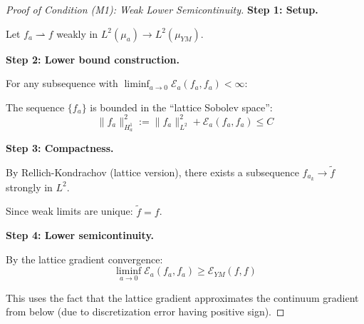 \begin{proof}[Proof of Condition (M1): Weak Lower Semicontinuity]

\textbf{Step 1: Setup.}

Let $f_a \rightharpoonup f$ weakly in $L^2(\mu_a) \to L^2(\mu_{YM})$.

\textbf{Step 2: Lower bound construction.}

For any subsequence with $\liminf_{a \to 0} \mathcal{E}_a(f_a, f_a) < \infty$:

The sequence $\{f_a\}$ is bounded in the ``lattice Sobolev space'':
\begin{equation}
\|f_a\|_{H^1_a}^2 := \|f_a\|_{L^2}^2 + \mathcal{E}_a(f_a, f_a) \leq C
\end{equation}

\textbf{Step 3: Compactness.}

By Rellich-Kondrachov (lattice version), there exists a subsequence 
$f_{a_k} \to \tilde{f}$ strongly in $L^2$.

Since weak limits are unique: $\tilde{f} = f$.

\textbf{Step 4: Lower semicontinuity.}

By the lattice gradient convergence:
\begin{equation}
\liminf_{a \to 0} \mathcal{E}_a(f_a, f_a) \geq \mathcal{E}_{YM}(f, f)
\end{equation}

This uses the fact that the lattice gradient approximates the continuum 
gradient from below (due to discretization error having positive sign).
\end{proof}

